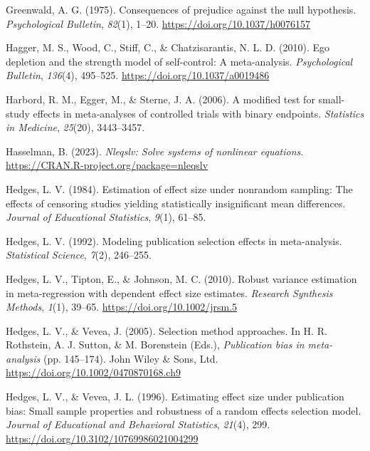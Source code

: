 \documentclass[
  american,
  man, donotrepeattitle,floatsintext]{apa7}
\newlength{\cslhangindent}
\newenvironment{CSLReferences}[2] %
 {\begin{list}{}{%
  \setlength{\itemindent}{0pt}
  \setlength{\leftmargin}{0pt}
  \setlength{\parsep}{0pt}
  \ifodd #1
   \setlength{\leftmargin}{\cslhangindent}
   \setlength{\itemindent}{-1\cslhangindent}
  \fi
  \setlength{\itemsep}{#2\baselineskip}}}
 {\end{list}}
\begin{document}
\begin{CSLReferences}{1}{0}
Greenwald, A. G. (1975). Consequences of prejudice against the null hypothesis. \emph{Psychological Bulletin}, \emph{82}(1), 1--20. \url{https://doi.org/10.1037/h0076157}

Hagger, M. S., Wood, C., Stiff, C., \& Chatzisarantis, N. L. D. (2010). Ego depletion and the strength model of self-control: {A} meta-analysis. \emph{Psychological Bulletin}, \emph{136}(4), 495--525. \url{https://doi.org/10.1037/a0019486}

Harbord, R. M., Egger, M., \& Sterne, J. A. (2006). A modified test for small-study effects in meta-analyses of controlled trials with binary endpoints. \emph{Statistics in Medicine}, \emph{25}(20), 3443--3457.

Hasselman, B. (2023). \emph{Nleqslv: Solve systems of nonlinear equations}. \url{https://CRAN.R-project.org/package=nleqslv}

Hedges, L. V. (1984). Estimation of effect size under nonrandom sampling: The effects of censoring studies yielding statistically insignificant mean differences. \emph{Journal of Educational Statistics}, \emph{9}(1), 61--85.

Hedges, L. V. (1992). Modeling publication selection effects in meta-analysis. \emph{Statistical Science}, \emph{7}(2), 246--255.

Hedges, L. V., Tipton, E., \& Johnson, M. C. (2010). {Robust variance estimation in meta-regression with dependent effect size estimates}. \emph{Research Synthesis Methods}, \emph{1}(1), 39--65. \url{https://doi.org/10.1002/jrsm.5}

Hedges, L. V., \& Vevea, J. (2005). Selection method approaches. In H. R. Rothstein, A. J. Sutton, \& M. Borenstein (Eds.), \emph{Publication bias in meta-analysis} (pp. 145--174). {John Wiley \& Sons, Ltd}. \url{https://doi.org/10.1002/0470870168.ch9}

Hedges, L. V., \& Vevea, J. L. (1996). {Estimating effect size under publication bias: Small sample properties and robustness of a random effects selection model}. \emph{Journal of Educational and Behavioral Statistics}, \emph{21}(4), 299. \url{https://doi.org/10.3102/10769986021004299}


\end{CSLReferences}
\end{document}

